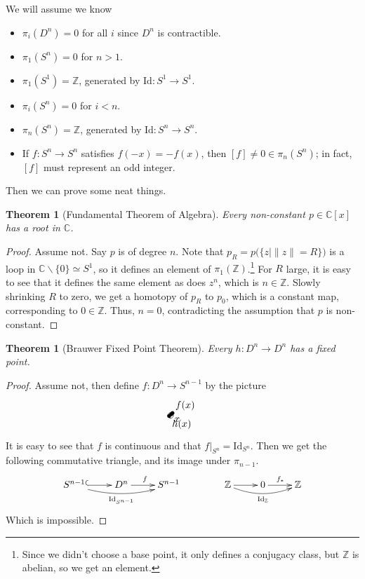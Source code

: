 \documentclass[12pt]{article}
\theoremstyle{plain}
\newtheorem{theorem}[equation]{Theorem}
\theoremstyle{definition}
\theoremstyle{remark}
\newcommand{\CC}{\ensuremath{\mathbb{C}}}
\newcommand{\id}{\mathrm{Id}}
\newcommand{\ZZ}{\ensuremath{\mathbb{Z}}}
\begin{document}
 We will assume we know
 \begin{itemize}
   \item $\pi_i(D^n)=0$ for all $i$ since $D^n$ is contractible.
   \item $\pi_1(S^n)=0$ for $n>1$.
   \item $\pi_1(S^1)=\ZZ$, generated by $\id:S^1\to S^1$.
   \item $\pi_i(S^n)=0$ for $i< n$.
   \item $\pi_n(S^n)=\ZZ$, generated by $\id:S^n\to S^n$.
   \item If $f:S^n\to S^n$ satisfies $f(-x)=-f(x)$, then $[f]\neq 0\in \pi_n(S^n)$; in
   fact, $[f]$ must represent an odd integer.
 \end{itemize}
 Then we can prove some neat things.
 \begin{theorem}[Fundamental Theorem of Algebra]
   Every non-constant $p\in \CC[x]$ has a root in $\CC$.
 \end{theorem}
 \begin{proof}
   Assume not. Say $p$ is of degree $n$. Note that $p_R=p\bigl( \{z| \|z\|=R\} \bigr)$ is
   a loop in $\CC\smallsetminus \{0\}\simeq S^1$, so it defines an element of
   $\pi_1(\ZZ)$.\footnote{Since we didn't choose a base point, it only defines a
   conjugacy class, but $\ZZ$ is abelian, so we get an element.} For $R$ large, it is
   easy to see that it defines the same element as does $z^n$, which is $n\in \ZZ$.
   Slowly shrinking $R$ to zero, we get a homotopy of $p_R$ to $p_0$, which is a constant
   map, corresponding to $0\in \ZZ$. Thus, $n=0$, contradicting the assumption that $p$
   is non-constant.
 \end{proof}
 \begin{theorem}[Brauwer Fixed Point Theorem]
   Every $h:D^n\to D^n$ has a fixed point.
 \end{theorem}
 \begin{proof}
   Assume not, then define $f:D^n\to S^{n-1}$ by the picture
   \[
   \begin{xy}
     0 *\xycircle(1,1){},
     (.2,.3) *{\bullet} *+!UL{x},
     (-.5,-.3) *{\bullet} *+!UL{h(x)};
     a(47) *{\bullet} *+!DL{f(x)} **@{-}
   \end{xy}
   \]
   It is easy to see that $f$ is continuous and that $f|_{S^n}=\id_{S^n}$. Then we get
   the following commutative triangle, and its image under $\pi_{n-1}$.
   \[\xymatrix{
    S^{n-1} \ar@{^(->}[r] \ar@/_2ex/[rr]_{\id_{S^{n-1}}} & D^n \ar[r]^f & S^{n-1}
   }\qquad\qquad
   \xymatrix{
    \ZZ \ar[r] \ar@/_2ex/[rr]_{\id_\ZZ} & 0 \ar[r]^{f_*} & \ZZ
   }\]
   Which is impossible.
 \end{proof}
\end{document}
